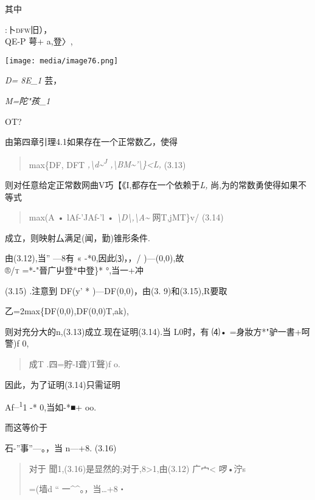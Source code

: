 \documentclass{article}
\begin{document}
其中

:卜\textsc{dfw}旧），\\
QE-P 萼+ a,登〉,

\texttt{[image: media/image76.png]}

\emph{D= 8E\_1} 芸，

\emph{M=陀"孩\_1}

OT?

由第四章引理4.1如果存在一个正常数乙，使得

\begin{quote}
max\{\textbar{}\textbar{}DF\textbar{}\textbar{},
\textbar{}\textbar{}DFT\textbar{}\textbar{}
\emph{,\textbackslash{}d\textasciitilde{}\textsuperscript{J}
\textbar{},\textbackslash{}BM\textasciitilde{}'\textbackslash{}\}\textless{}L,}
(3.13)
\end{quote}

则对任意给定正常数网曲V巧【《I,都存在一个依赖于\emph{L,}
尚,为的常数勇使得如果不等式

\begin{quote}
max(\textbar{}A\textbar{} • lAf-'JAf-'l •
\emph{\textbackslash{}D\textbackslash{},\textbackslash{}A\textasciitilde{}}
网T\textbar{},jMT\textbar{}\}v/ (3.14)
\end{quote}

成立，则映射厶满足(闻，勤)锥形条件.

由(3.12),当'' ---8有 « -*0,因此⑶，，/ )---(0,0),故\\
\textsc{\textbar{}®/t\textbar{}} =*-"晉广屮登*中登\}* °,当一+冲

(3.15) .注意到 DF(y' * )---DF(0,0)，由(3. 9)和(3.15),R要取

乙=2max\{\textbar{}\textbar{}DF(0,0)\textbar{}\textbar{},\textbar{}\textbar{}DF(0,0)T\textbar{}\textbar{},\textbar{}ak\textbar{}),

则对充分大的n,(3.13)成立.现在证明(3.14).当 L0时，有 ⑷•
=身妝方*"驴一書+呵警)f 0,

\begin{quote}
成T\textbar{} .四=貯-I聋)T聲)\textbar{}f o.
\end{quote}

因此，为了证明(3.14)只需证明

\textbar{}Af\textsuperscript{\_1}1 -* 0,当如-*■+ oo.

而这等价于

石-''事''---。，当 n---+8. (3.16)

\begin{quote}
对于 聞1,(3.16)是显然的;对于,8\textgreater{}1,由(3.12) 广宀\textless{}
啰•泞s

=(墙d `` 一\^{}\^{}。，当\ldots{}+8・
\end{quote}
\end{document}
